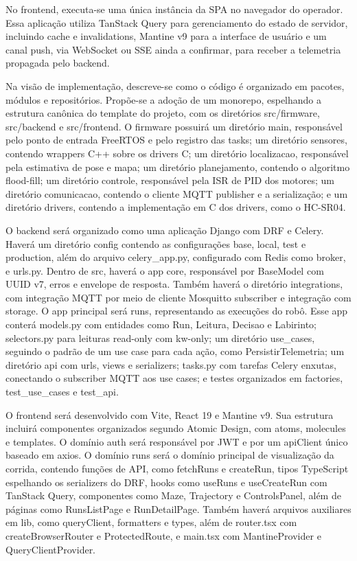     No frontend, executa-se uma única instância da SPA no navegador do operador. Essa aplicação utiliza TanStack Query para gerenciamento do estado de servidor, incluindo cache e invalidations, Mantine v9 para a interface de usuário e um canal push, via WebSocket ou SSE ainda a confirmar, para receber a telemetria propagada pelo backend.

    Na visão de implementação, descreve-se como o código é organizado em pacotes, módulos e repositórios. Propõe-se a adoção de um monorepo, espelhando a estrutura canônica do template do projeto, com os diretórios src/firmware, src/backend e src/frontend. O firmware possuirá um diretório main, responsável pelo ponto de entrada FreeRTOS e pelo registro das tasks; um diretório sensores, contendo wrappers C++ sobre os drivers C; um diretório localizacao, responsável pela estimativa de pose e mapa; um diretório planejamento, contendo o algoritmo flood-fill; um diretório controle, responsável pela ISR de PID dos motores; um diretório comunicacao, contendo o cliente MQTT publisher e a serialização; e um diretório drivers, contendo a implementação em C dos drivers, como o HC-SR04.

    O backend será organizado como uma aplicação Django com DRF e Celery. Haverá um diretório config contendo as configurações base, local, test e production, além do arquivo celery\_app.py, configurado com Redis como broker, e urls.py. Dentro de src, haverá o app core, responsável por BaseModel com UUID v7, erros e envelope de resposta. Também haverá o diretório integrations, com integração MQTT por meio de cliente Mosquitto subscriber e integração com storage. O app principal será runs, representando as execuções do robô. Esse app conterá models.py com entidades como Run, Leitura, Decisao e Labirinto; selectors.py para leituras read-only com kw-only; um diretório use\_cases, seguindo o padrão de um use case para cada ação, como PersistirTelemetria; um diretório api com urls, views e serializers; tasks.py com tarefas Celery enxutas, conectando o subscriber MQTT aos use cases; e testes organizados em factories, test\_use\_cases e test\_api.

    O frontend será desenvolvido com Vite, React 19 e Mantine v9. Sua estrutura incluirá componentes organizados segundo Atomic Design, com atoms, molecules e templates. O domínio auth será responsável por JWT e por um apiClient único baseado em axios. O domínio runs será o domínio principal de visualização da corrida, contendo funções de API, como fetchRuns e createRun, tipos TypeScript espelhando os serializers do DRF, hooks como useRuns e useCreateRun com TanStack Query, componentes como Maze, Trajectory e ControlsPanel, além de páginas como RunsListPage e RunDetailPage. Também haverá arquivos auxiliares em lib, como queryClient, formatters e types, além de router.tsx com createBrowserRouter e ProtectedRoute, e main.tsx com MantineProvider e QueryClientProvider.

